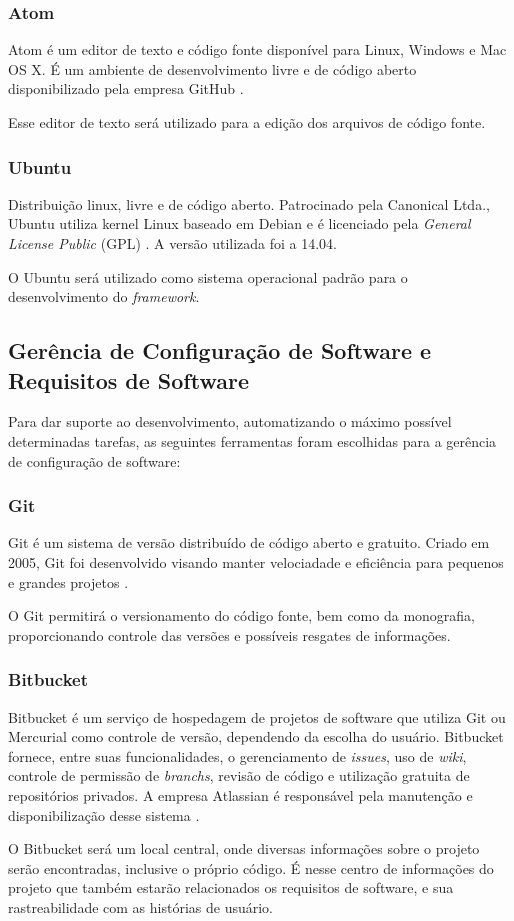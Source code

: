 \subsubsection{Atom}
Atom é um editor de texto e código fonte disponível para Linux, Windows e Mac OS X. É um ambiente de desenvolvimento livre e de código aberto disponibilizado pela empresa GitHub \cite{atom2015}.
\par
\indent Esse editor de texto será utilizado para a edição dos arquivos de código fonte.

\subsubsection{Ubuntu}
Distribuição linux, livre e de código aberto. Patrocinado pela Canonical Ltda., Ubuntu utiliza kernel Linux baseado em Debian e é licenciado pela \textit{General License Public} (GPL) \cite{ubuntu2010}. A versão utilizada foi a 14.04.
\par
\indent O Ubuntu será utilizado como sistema operacional padrão para o desenvolvimento do \textit{framework}.

\subsection{Gerência de Configuração de Software e Requisitos de Software}
Para dar suporte ao desenvolvimento, automatizando o máximo possível determinadas tarefas, as seguintes ferramentas foram escolhidas para a gerência de configuração de software:

\subsubsection{Git}
Git é um sistema de versão distribuído de código aberto e gratuito. Criado em 2005, Git foi desenvolvido visando manter velociadade e eficiência para pequenos e grandes projetos \cite{git2015}. 
\par
\indent O Git permitirá o versionamento do código fonte, bem como da monografia, proporcionando controle das versões e possíveis resgates de informações.

\subsubsection{Bitbucket}
Bitbucket é um serviço de hospedagem de projetos de software que utiliza Git ou Mercurial como controle de versão, dependendo da escolha do usuário. Bitbucket fornece, entre suas funcionalidades, o gerenciamento de \textit{issues}, uso de \textit{wiki}, controle de permissão de \textit{branchs}, revisão de código e utilização gratuita de repositórios privados. A empresa Atlassian é responsável pela manutenção e disponibilização desse sistema \cite{bitbucket2008}.
\par
\indent O Bitbucket será um local central, onde diversas informações sobre o projeto serão encontradas, inclusive o próprio código. É nesse centro de informações do projeto que também estarão relacionados os requisitos de software, e sua rastreabilidade com as histórias de usuário.

